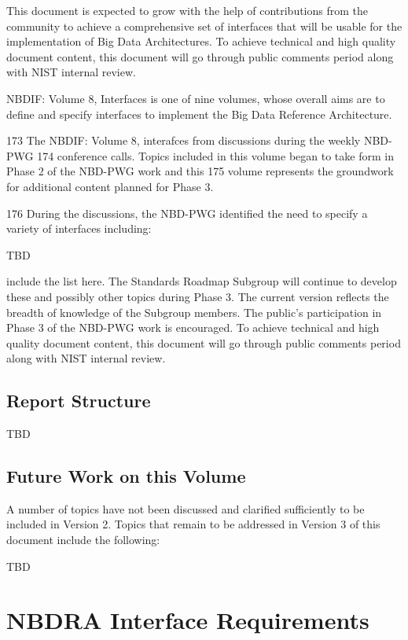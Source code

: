 \documentclass[10pt]{article}
\begin{document}
This document is expected to grow with the help of contributions from the community to achieve a
comprehensive set of interfaces that will be usable for the implementation of Big Data Architectures.
To achieve technical and high quality document content, this document will go through public comments
period along with NIST internal review.


NBDIF: Volume 8, Interfaces is one of nine volumes, whose overall aims
are to define and specify interfaces to implement the Big Data
Reference Architecture.

173 The NBDIF: Volume 8, interafces from discussions during the weekly
NBD-PWG 174 conference calls. Topics included in this volume began to
take form in Phase 2 of the NBD-PWG work and this 175 volume
represents the groundwork for additional content planned for Phase 3.

176 During the discussions, the NBD-PWG identified the need to specify
a variety of interfaces including:

TBD 


include the list here. The Standards Roadmap Subgroup will continue to
develop these and possibly other topics during Phase 3. The current
version reflects the breadth of knowledge of the Subgroup members. The
public’s participation in Phase 3 of the NBD-PWG work is encouraged.
To achieve technical and high quality document content, this document
will go through public comments period along with NIST internal
review.


\subsection{Report Structure}

TBD

\subsection{Future Work on this Volume}

A number of topics have not been discussed and clarified sufficiently
to be included in Version 2. Topics that remain to be addressed in
Version 3 of this document include the following:

TBD

\newpage 

\section{NBDRA Interface Requirements}
\end{document}
